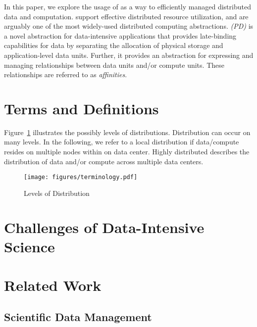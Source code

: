 \documentclass{sig-alternate}
\begin{document}
In this paper, we explore the usage of \pilotjobs as a way to efficiently
managed distributed data and computation. \pilotjobs support effective
distributed resource utilization, and are arguably one of the most widely-used
distributed computing abstractions. \emph{\pilotdata (PD)} is a novel
abstraction for data-intensive applications that provides late-binding
capabilities for data by separating the allocation of physical storage and
application-level data units. Further, it provides an abstraction for
expressing and managing relationships between data units and/or compute units.
These relationships are referred to as \emph{affinities}.



\section{Terms and Definitions}


Figure~\ref{fig:figures_terminology} illustrates the possibly levels of
distributions. Distribution can occur on many levels. In the following, we
refer to a local distribution if data/compute resides on multiple nodes within
on data center. Highly distributed describes the distribution of data and/or 
compute across multiple data centers.


\begin{figure}[htbp]
	\centering
		\texttt{[image: figures/terminology.pdf]}
	\caption{Levels of Distribution  }
	\label{fig:figures_terminology}
\end{figure}



\section{Challenges of Data-Intensive Science}



\section{Related Work}



\subsection{Scientific Data Management}
\end{document}
